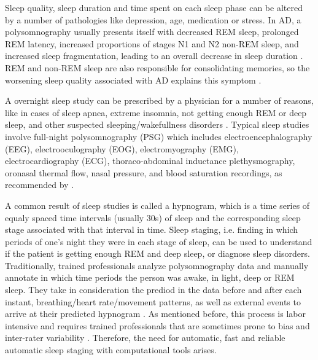 Sleep quality, sleep duration and time spent on each sleep phase can be altered by a number of pathologies like depression, age, medication or stress.
In AD, a polysomnography usually presents itself with decreased REM sleep, prolonged REM latency, increased proportions of stages N1 and N2 non-REM sleep, and increased sleep fragmentation, leading to an overall decrease in sleep duration \cite{2014sleepAD}. REM and non-REM sleep are also responsible for consolidating memories, so the worsening sleep quality associated with AD explains this symptom \cite{2014sleepAD}.

A overnight sleep study can be prescribed by a physician for a number of reasons, like in cases of sleep apnea, extreme insomnia, not getting enough REM or deep sleep, and other suspected sleeping/wakefullness disorders \cite{2012AASMManualForSleepScoring}.
Typical sleep studies involve full-night polysomnography (PSG) which includes electroencephalography (EEG), electrooculography (EOG), electromyography (EMG), electrocardiography (ECG), thoraco-abdominal inductance plethysmography, oronasal thermal flow, nasal pressure, and blood saturation recordings, as recommended by \cite{2012AASMManualForSleepScoring,Alexander2020}. 


A common result of sleep studies is called a hypnogram, which is a time series of equaly spaced time intervals (usually 30s) of sleep and the corresponding sleep stage associated with that interval in time. 
Sleep staging, i.e. finding in which periods of one's night they were in each stage of sleep, can be used to understand if the patient is getting enough REM and deep sleep, or diagnose sleep disorders.
Traditionally, trained professionals analyze polysomnography data and manually annotate in which time periods the person was awake, in light, deep or REM sleep. They take in consideration the prediod in the data before and after each instant, breathing/heart rate/movement patterns, as well as external events to arrive at their predicted hypnogram \cite{2012AASMManualForSleepScoring}. 
As mentioned before, this process is labor intensive and requires trained professionals that are sometimes prone to bias and inter-rater variability \cite{Alexander2020,2022automaticEEG}. Therefore, the need for automatic, fast and reliable automatic sleep staging with computational tools arises.





